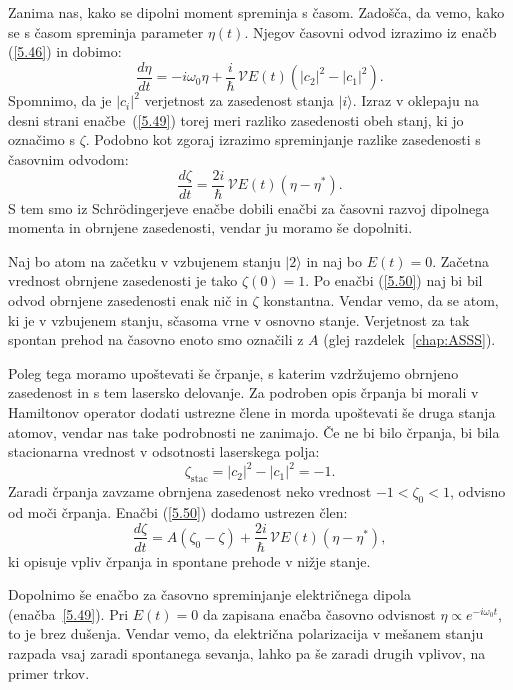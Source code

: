 Zanima nas, kako se dipolni moment spreminja s časom. Zadošča, da vemo, kako se 
s časom spreminja parameter $\eta(t)$. Njegov časovni odvod izrazimo
iz enačb (\ref{5.46}) in dobimo:
\begin{equation}  
\label{5.49}
\frac{d\eta}{dt}=- i \omega_0\eta+\frac{i}{\hslash}\,\mathcal{V}E(t) \left(|c_2|^2-|c_1|^2\right)\!\!.
\end{equation}
Spomnimo, da je $|c_i|^2$ verjetnost za zasedenost stanja $|i\rangle$. Izraz v oklepaju
na desni strani enačbe~(\ref{5.49}) torej meri razliko zasedenosti obeh stanj, ki jo označimo
s $\zeta$. Podobno kot zgoraj izrazimo spreminjanje razlike zasedenosti s časovnim odvodom:
\begin{equation}  
\label{5.50}
\frac{d\zeta}{dt}=\frac{2i}{\hslash}\, \mathcal{V} E(t)\left(\eta- \eta^{\ast}\right)\!\!.
\end{equation}
S tem smo iz Schr\"odingerjeve enačbe dobili enačbi za časovni razvoj
dipolnega momenta in obrnjene zasedenosti, vendar ju moramo še dopolniti.

Naj bo atom na začetku v vzbujenem stanju $|2\rangle$ in naj bo $E(t)=0$. Začetna
vrednost obrnjene zasedenosti je tako $\zeta(0)=1$. Po enačbi (\ref{5.50}) naj bi 
bil odvod obrnjene zasedenosti enak nič in $\zeta$ konstantna. 
Vendar vemo, da se atom, ki je v vzbujenem stanju, sčasoma vrne v
osnovno stanje. Verjetnost za tak spontan prehod na časovno enoto smo označili z $A$ (glej 
razdelek~\ref{chap:ASSS}).

Poleg tega moramo upoštevati še črpanje, s katerim
vzdržujemo obrnjeno zasedenost in s tem lasersko delovanje. Za podroben
opis črpanja bi morali v Hamiltonov operator dodati ustrezne člene in
morda upoštevati še druga stanja atomov, vendar nas take podrobnosti 
ne zanimajo. Če ne bi bilo črpanja, bi bila stacionarna vrednost
v odsotnosti laserskega polja:
\begin{equation}
 \zeta_{\mathrm{stac}}= |c_2|^2-|c_1|^2 = -1.
\end{equation}
Zaradi črpanja zavzame obrnjena zasedenost neko vrednost $-1<\zeta_0<1$, 
odvisno od moči črpanja. Enačbi (\ref{5.50}) dodamo ustrezen člen:
\begin{equation}  
\label{5.51}
\frac{d\zeta}{dt}=A\left(\zeta_0-\zeta\right)+\frac{2i}{\hslash}\,\mathcal{V}E(t)\left(\eta-\eta^{\ast}\right)\!\!,
\end{equation}
ki opisuje vpliv črpanja in spontane prehode v nižje stanje. 

Dopolnimo še enačbo za časovno spreminjanje električnega dipola 
(enačba~\ref{5.49}). Pri $E(t)=0$ da zapisana enačba časovno odvisnost 
$\eta \propto e^{-i \omega_0 t}$, to je brez dušenja. Vendar vemo, da električna
polarizacija v mešanem stanju razpada vsaj zaradi spontanega sevanja, lahko
pa še zaradi drugih vplivov, na primer trkov. 

